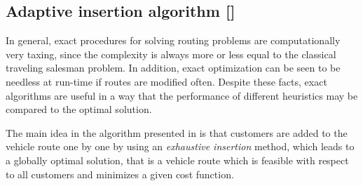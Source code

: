 \documentclass[dissertation,draft*]{aaltoseries}
\begin{document}
% 
% 


\subsection{Adaptive insertion algorithm []}
In general, exact procedures for solving routing  
problems are computationally very taxing, since the complexity is always more or 
less equal to the classical traveling salesman problem.
In addition, exact optimization can be seen to be needless at run-time if routes are modified often. 
Despite these facts, exact algorithms are useful in a way that the 
performance of different heuristics may be compared to the optimal solution. 

The main idea in the algorithm presented in  is that customers are added to 
the vehicle route one by one by using an \emph{exhaustive insertion} method,
which leads to a globally optimal solution, that is a vehicle route 
which is feasible with respect to all customers and minimizes a given cost function. 
\end{document}
